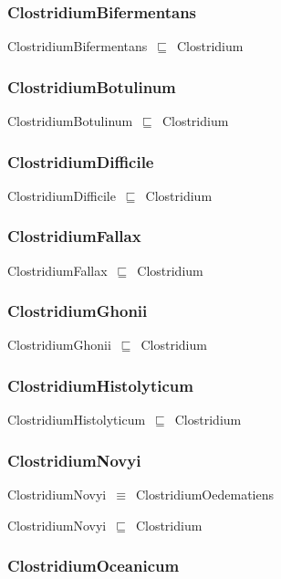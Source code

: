 \documentclass{article}
\begin{document}
\subsubsection*{ClostridiumBifermentans}

ClostridiumBifermentans~\ensuremath{\sqsubseteq}~Clostridium~

\subsubsection*{ClostridiumBotulinum}

ClostridiumBotulinum~\ensuremath{\sqsubseteq}~Clostridium~

\subsubsection*{ClostridiumDifficile}

ClostridiumDifficile~\ensuremath{\sqsubseteq}~Clostridium~

\subsubsection*{ClostridiumFallax}

ClostridiumFallax~\ensuremath{\sqsubseteq}~Clostridium~

\subsubsection*{ClostridiumGhonii}

ClostridiumGhonii~\ensuremath{\sqsubseteq}~Clostridium~

\subsubsection*{ClostridiumHistolyticum}

ClostridiumHistolyticum~\ensuremath{\sqsubseteq}~Clostridium~

\subsubsection*{ClostridiumNovyi}

ClostridiumNovyi~\ensuremath{\equiv}~ClostridiumOedematiens

ClostridiumNovyi~\ensuremath{\sqsubseteq}~Clostridium~

\subsubsection*{ClostridiumOceanicum}
\end{document}
